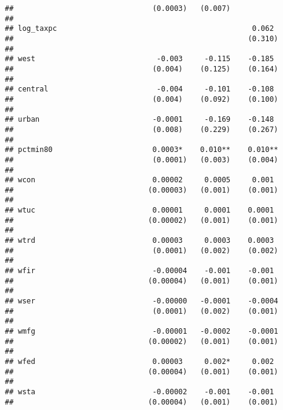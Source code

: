 \documentclass[
]{article}
\begin{document}
\begin{verbatim}
##                                (0.0003)   (0.007)            
##                                                              
## log_taxpc                                             0.062  
##                                                      (0.310) 
##                                                              
## west                            -0.003     -0.115    -0.185  
##                                (0.004)    (0.125)    (0.164) 
##                                                              
## central                         -0.004     -0.101    -0.108  
##                                (0.004)    (0.092)    (0.100) 
##                                                              
## urban                          -0.0001     -0.169    -0.148  
##                                (0.008)    (0.229)    (0.267) 
##                                                              
## pctmin80                       0.0003*    0.010**    0.010** 
##                                (0.0001)   (0.003)    (0.004) 
##                                                              
## wcon                           0.00002     0.0005     0.001  
##                               (0.00003)   (0.001)    (0.001) 
##                                                              
## wtuc                           0.00001     0.0001    0.0001  
##                               (0.00002)   (0.001)    (0.001) 
##                                                              
## wtrd                           0.00003     0.0003    0.0003  
##                                (0.0001)   (0.002)    (0.002) 
##                                                              
## wfir                           -0.00004    -0.001    -0.001  
##                               (0.00004)   (0.001)    (0.001) 
##                                                              
## wser                           -0.00000   -0.0001    -0.0004 
##                                (0.0001)   (0.002)    (0.001) 
##                                                              
## wmfg                           -0.00001   -0.0002    -0.0001 
##                               (0.00002)   (0.001)    (0.001) 
##                                                              
## wfed                           0.00003     0.002*     0.002  
##                               (0.00004)   (0.001)    (0.001) 
##                                                              
## wsta                           -0.00002    -0.001    -0.001  
##                               (0.00004)   (0.001)    (0.001) 

\end{verbatim}
\end{document}
